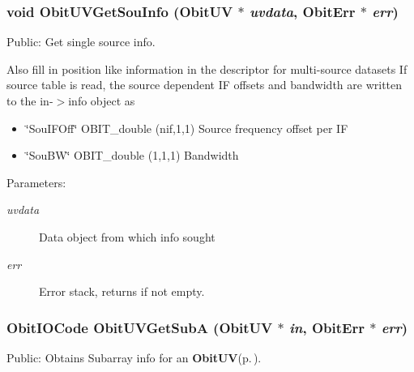 \subsubsection{\setlength{\rightskip}{0pt plus 5cm}void Obit\-UVGet\-Sou\-Info ({\bf Obit\-UV} $\ast$ {\em uvdata}, {\bf Obit\-Err} $\ast$ {\em err})}\label{ObitUV_8c_a38}


Public: Get single source info. 

Also fill in position like information in the descriptor for multi-source datasets If source table is read, the source dependent IF offsets and bandwidth are written to the in-$>$info object as \begin{itemize}
\item \char`\"{}Sou\-IFOff\char`\"{} OBIT\_\-double (nif,1,1) Source frequency offset per IF \item \char`\"{}Sou\-BW\char`\"{} OBIT\_\-double (1,1,1) Bandwidth\end{itemize}
\begin{Desc}
\item[Parameters:]
\begin{description}
\item[{\em uvdata}]Data object from which info sought \item[{\em err}]Error stack, returns if not empty. \end{description}
\end{Desc}
\subsubsection{\setlength{\rightskip}{0pt plus 5cm}Obit\-IOCode Obit\-UVGet\-Sub\-A ({\bf Obit\-UV} $\ast$ {\em in}, {\bf Obit\-Err} $\ast$ {\em err})}\label{ObitUV_8c_a35}


Public: Obtains Subarray info for an {\bf Obit\-UV}{\rm (p.\,\pageref{structObitUV})}. 

